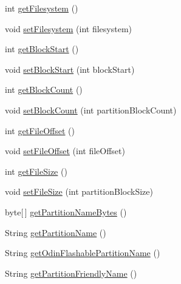 \begin{DoxyCompactItemize}
int \hyperlink{class_c_a_s_u_a_l_1_1archiving_1_1libpit_1_1_pit_entry_a7bd0ed05426235715456a03d85d4add7}{get\-Filesystem} ()
\item 
void \hyperlink{class_c_a_s_u_a_l_1_1archiving_1_1libpit_1_1_pit_entry_aaa4ed31403b52a9d53aeec85e1ff49bd}{set\-Filesystem} (int filesystem)
\item 
int \hyperlink{class_c_a_s_u_a_l_1_1archiving_1_1libpit_1_1_pit_entry_ab2d83a89e4caa5a2396065cc8351b1a4}{get\-Block\-Start} ()
\item 
void \hyperlink{class_c_a_s_u_a_l_1_1archiving_1_1libpit_1_1_pit_entry_ad62d20ea45e2b47741376c567fbf5abb}{set\-Block\-Start} (int block\-Start)
\item 
int \hyperlink{class_c_a_s_u_a_l_1_1archiving_1_1libpit_1_1_pit_entry_a71f70a12ea451e371d05724bf1be8893}{get\-Block\-Count} ()
\item 
void \hyperlink{class_c_a_s_u_a_l_1_1archiving_1_1libpit_1_1_pit_entry_a30bbfb8aad7ebb3e1e67a97a9e0dff39}{set\-Block\-Count} (int partition\-Block\-Count)
\item 
int \hyperlink{class_c_a_s_u_a_l_1_1archiving_1_1libpit_1_1_pit_entry_a18188ca9574796012da0e09c7d0ea26e}{get\-File\-Offset} ()
\item 
void \hyperlink{class_c_a_s_u_a_l_1_1archiving_1_1libpit_1_1_pit_entry_a4196abd6bae4940c3ed5d5a0eb95c6bb}{set\-File\-Offset} (int file\-Offset)
\item 
int \hyperlink{class_c_a_s_u_a_l_1_1archiving_1_1libpit_1_1_pit_entry_a01deff38488725386c61df5a471f174c}{get\-File\-Size} ()
\item 
void \hyperlink{class_c_a_s_u_a_l_1_1archiving_1_1libpit_1_1_pit_entry_a86955e5ab2b342c853cc4b67fe0749b9}{set\-File\-Size} (int partition\-Block\-Size)
\item 
byte\mbox{[}$\,$\mbox{]} \hyperlink{class_c_a_s_u_a_l_1_1archiving_1_1libpit_1_1_pit_entry_aecce239dfd9e37cf3f336e70b246d6cc}{get\-Partition\-Name\-Bytes} ()
\item 
String \hyperlink{class_c_a_s_u_a_l_1_1archiving_1_1libpit_1_1_pit_entry_a59b8dd55f03fa04659a3c2b4d10902f1}{get\-Partition\-Name} ()
\item 
String \hyperlink{class_c_a_s_u_a_l_1_1archiving_1_1libpit_1_1_pit_entry_ac16fbb066452b2dbe3081935eeb44dbc}{get\-Odin\-Flashable\-Partition\-Name} ()
\item 
String \hyperlink{class_c_a_s_u_a_l_1_1archiving_1_1libpit_1_1_pit_entry_a67d785987fd5e3db81f397e9aebfcb0d}{get\-Partition\-Friendly\-Name} ()
\item 

\end{DoxyCompactItemize}

